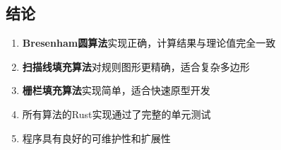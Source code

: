 ﻿\documentclass[12pt,a4paper]{article}
\begin{document}
\subsection{结论}

\begin{enumerate}
\item \textbf{Bresenham圆算法}实现正确，计算结果与理论值完全一致
\item \textbf{扫描线填充算法}对规则图形更精确，适合复杂多边形
\item \textbf{栅栏填充算法}实现简单，适合快速原型开发
\item 所有算法的Rust实现通过了完整的单元测试
\item 程序具有良好的可维护性和扩展性
\end{enumerate}
\end{document}

